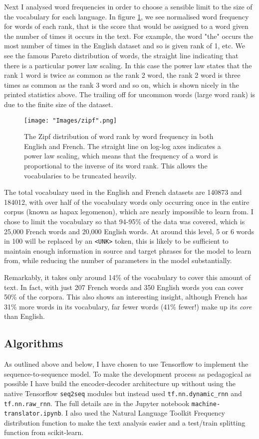 \documentclass[]{article}
\begin{document}
Next I analysed word frequencies in order to choose a sensible limit to the size of the vocabulary for each language. In figure \ref{fig:zipf}, we see normalised word frequency for words of each rank, that is the score that would be assigned to a word given the number of times it occurs in the text. For example, the word "the" occurs the most number of times in the English dataset and so is given rank of 1, etc. We see the famous Pareto distribution of words, the straight line indicating that there is a particular power law scaling. In this case the power law states that the rank 1 word is twice as common as the rank 2 word, the rank 2 word is three times as common as the rank 3 word and so on, which is shown nicely in the printed statistics above. The trailing off for uncommon words (large word rank) is due to the finite size of the dataset.
\begin{figure}[t]	\centering
	\texttt{[image: "Images/zipf".png]}
	\caption{The Zipf distribution of word rank by word frequency in both English and French. The straight line on log-log axes indicates a power law scaling, which means that the frequency of a word is proportional to the inverse of its word rank. This allows the vocabularies to be truncated heavily.}
	\label{fig:zipf}
\end{figure}
The total vocabulary used in the English and French datasets are 140873 and 184012, with over half of the vocabulary words only occurring once in the entire corpus (known as hapax legomenon), which are nearly impossible to learn from. I chose to limit the vocabulary so that 94-95\% of the data was covered, which is 25,000 French words and 20,000 English words. At around this level, 5 or 6 words in 100 will be replaced by an \lstinline{<UNK>} token, this is likely to be sufficient to maintain enough information in source and target phrases for the model to learn from, while reducing the number of parameters in the model substantially. 

Remarkably, it takes only around 14\% of the vocabulary to cover this amount of text. In fact, with just 207 French words and 350 English words you can cover 50\% of the corpora. This also shows an interesting insight, although French has 31\% more words in its vocabulary, far fewer words (41\% fewer!) make up its \textit{core} than English.


\subsection{Algorithms}
As outlined above and below, I have chosen to use Tensorflow to implement the sequence-to-sequence model. To make the development process as pedagogical as possible I have build the encoder-decoder architecture up without using the native Tensorflow \lstinline{seq2seq} modules but instead used \lstinline{tf.nn.dynamic_rnn} and \lstinline{tf.nn.raw_rnn}. The full details are in the Jupyter notebook \lstinline{machine-translator.ipynb}. I also used the Natural Language Toolkit Frequency distribution function to make the text analysis easier and a test/train splitting function from scikit-learn.
\end{document}
